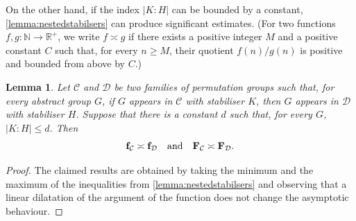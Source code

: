 \documentclass[a4paper]{amsart}
\newcommand{\f}{\mathbf{f}}
\newcommand{\F}{\mathbf{F}}
\newcommand{\m}{\mathbf{m}}
\newcommand{\C}{\mathcal{C}}
\newcommand{\D}{\mathcal{D}}
\newcommand{\NN}{\mathbb{N}}
\newcommand{\act}{\,\rotatebox[origin=c]{-180}{$\circlearrowright$}\,}
\newtheorem{lemma}[theorem]{Lemma}
\theoremstyle{definition}
\begin{document}
On the other hand, if the index $|K:H|$ can be bounded by a constant, \cref{lemma:nestedstabilsers} can produce significant estimates. (For two functions $f,g: \NN \to \mathbb{R}^+$, we write $f \asymp g$ if there exists a positive integer $M$ and a positive constant $C$ such that, for every $n\ge M$, their quotient $f(n)/g(n)$ is positive and bounded from above by $C$.)

\begin{lemma}\label{lemma:familyBounded}
    Let $\C$ and $\D$ be two families of permutation groups such that, for every abstract group $G$, if $G$ appears in $\C$ with stabiliser $K$, then $G$ appears in $\D$ with stabiliser $H$. Suppose that there is a constant $d$ such that, for every $G$, $|K:H|\le d$. Then
    \[ \f_\C \asymp \f_\D \quad \hbox{and} \quad \F_\C \asymp \F_\D .\]
    
\end{lemma}
\begin{proof}
The claimed results are obtained by taking the minimum and the maximum of the inequalities from \cref{lemma:nestedstabilsers} and observing that a linear dilatation of the argument of the function does not change the asymptotic behaviour.
\end{proof}

\end{document}
